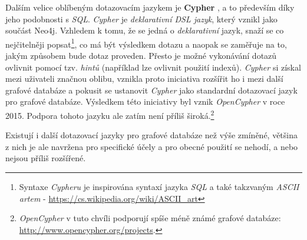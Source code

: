 Dalším velice oblíbeným dotazovacím jazykem je \textbf{Cypher} \cite{Cypher}, a to především díky jeho podobnosti s \textit{SQL}. \textit{Cypher} je \textit{deklarativní DSL jazyk}, který vznikl jako součást Neo4j. Vzhledem k tomu, že se jedná o \textit{deklarativní} jazyk, snaží se co nejčitelněji popsat\footnote{Syntaxe \textit{Cypheru} je inspirována syntaxí jazyka \textit{SQL} a také takzvaným \textit{ASCII artem} - \url{https://cs.wikipedia.org/wiki/ASCII_art}}, co má být výsledkem dotazu a naopak se zaměřuje na to, jakým způsobem bude dotaz proveden. Přesto je možné vykonávání dotazů ovlivnit pomocí tzv. \textit{hintů} (například lze ovlivnit použití indexů). \textit{Cypher} si získal mezi uživateli  značnou oblibu, vznikla proto iniciativa rozšířit ho i mezi další grafové databáze a pokusit se ustanovit \textit{Cypher} jako standardní dotazovací jazyk pro grafové databáze. Výsledkem této iniciativy byl vznik \textit{OpenCypher} \cite{openCypher} v roce 2015. Podpora tohoto jazyku ale zatím není příliš široká.\footnote{\textit{OpenCypher} v tuto chvíli podporují spíše méně známé grafové databáze: \url{http://www.opencypher.org/projects}.}

Existují i další dotazovací jazyky pro grafové databáze než výše zmíněné, většina z nich je ale navržena pro specifické účely a pro obecné použití se nehodí, a nebo nejsou příliš rozšířené. 








